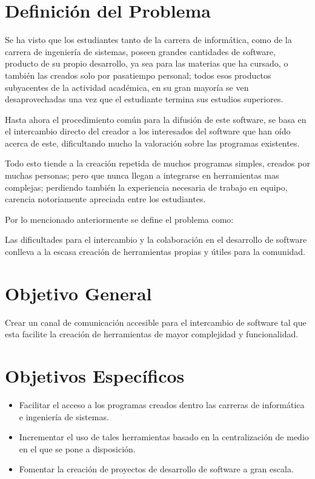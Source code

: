 \documentclass[letter,12pt]{article}
\begin{document}
\section{Definición del Problema}
Se ha visto que los estudiantes tanto de la carrera de informática, como de la carrera de
ingeniería de sistemas, poseen grandes cantidades de software, producto de su propio desarrollo, ya
sea para las materias que ha cursado, o también las creados solo por pasatiempo personal; todos
esos productos subyacentes de la actividad académica, en su gran mayoría se ven desaprovechadas una
vez que el estudiante termina sus estudios superiores.

Hasta ahora el procedimiento común para la difusión de este software, se basa en el intercambio
directo del creador a los interesados del software que han oído acerca de este, dificultando mucho
la valoración sobre las programas existentes.

Todo esto tiende a la creación repetida de muchos programas simples, creados por muchas personas;
pero que nunca llegan a integrarse en herramientas mas complejas; perdiendo también la experiencia
necesaria de trabajo en equipo, carencia notoriamente apreciada entre los estudiantes.

Por lo mencionado anteriormente se define el problema como:

Las dificultades para el intercambio y la colaboración en el desarrollo de software conlleva a la
escasa creación de herramientas propias y útiles para la comunidad.

\section{Objetivo General}
Crear un canal de comunicación accesible para el intercambio de software tal que esta facilite la
creación de herramientas de mayor complejidad y funcionalidad.

\section{Objetivos Específicos}
\begin{itemize}
\item Facilitar el acceso a los programas creados dentro las carreras de informática e ingeniería
de sistemas.
\item Incrementar el uso de tales herramientas basado en la centralización de medio en el que se
pone a disposición.
\item Fomentar la creación de proyectos de desarrollo de software a gran escala.
\end{itemize}
\end{document}
